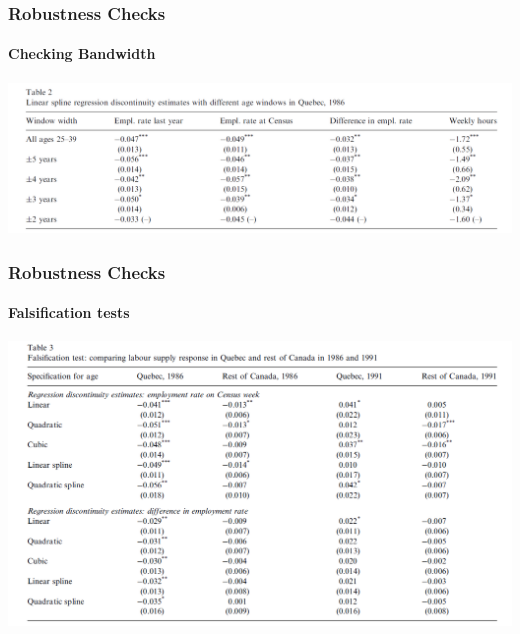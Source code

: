 \documentclass{beamer}
\begin{document}

\begin{frame}
\frametitle{Robustness Checks}
\framesubtitle{Checking Bandwidth}

\begin{center}
	
	\includegraphics[width=.95\linewidth]{table_2.PNG}
	
\end{center}

\end{frame}



\begin{frame}
\frametitle{Robustness Checks}
\framesubtitle{Falsification tests}

\begin{center}
	
	\includegraphics[width=1\linewidth]{table_3.PNG}
	
\end{center}

\end{frame}
\end{document}
